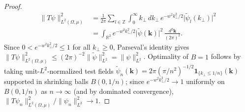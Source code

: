 \documentclass[aps,pra,onecolumn,notitlepage,11pt,tightenlines,nofootinbib,floatfix,longbibliography]{revtex4-2}
\theoremstyle{remark}
\newcommand{\norm}[1]{\lVert #1 \rVert}
\newcommand{\abs}[1]{\lvert #1 \rvert}
\begin{document}
\begin{proof}
\begin{align*}
\norm{T\psi}_{L^2(\Omega,\mu)}^2 &= \frac{1}{2\pi}\sum_{l\in\mathbb{Z}} \int_0^\infty k_\perp\,dk_\perp\,e^{-w^2 k_\perp^2/2}\abs{\widetilde{\psi}_l(k_\perp)}^2 \\
&= \int_{\mathbb{R}^2} e^{-w^2 k_\perp^2/2}\abs{\widetilde{\psi}(\mathbf{k})}^2\,\frac{d^2\mathbf{k}}{(2\pi)^2}.
\end{align*}
Since $0 < e^{-w^2 k_\perp^2/2} \le 1$ for all $k_\perp \ge 0$, Parseval's identity gives $\norm{T\psi}_{L^2(\Omega,\mu)}^2 \le (2\pi)^{-2}\norm{\widetilde{\psi}}_{L^2}^2 = \norm{\psi}_{L^2}^2$. Optimality of $B = 1$ follows by taking unit-$L^2$-normalized test fields $\widetilde{\psi}_n(\mathbf{k}) = 2\pi(\pi/n^2)^{-1/2}\mathbf{1}_{\{k_\perp \le 1/n\}}(\mathbf{k})$ supported in shrinking balls $B(0,1/n)$; since $e^{-w^2 k_\perp^2/2} \to 1$ uniformly on $B(0,1/n)$ as $n \to \infty$ (and by dominated convergence), $\norm{T\psi_n}_{L^2(\Omega,\mu)}^2/\norm{\psi_n}_{L^2}^2 \to 1$.
\end{proof}
\end{document}
